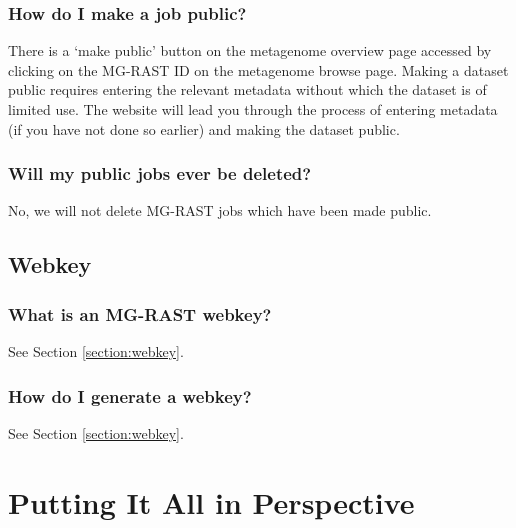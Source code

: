 \documentclass[12pt,fullpage]{report}
\begin{document}
\subsection{How do I make a job public?}
There is a `make public' button on the metagenome overview page accessed by clicking on the MG-RAST ID on the metagenome browse page. Making a dataset public requires entering the relevant metadata without which the dataset is of limited use. The website will lead you through the process of entering metadata (if you have not done so earlier) and making the dataset public.
\subsection{Will my public jobs ever be deleted?}
No, we will not delete MG-RAST jobs which have been made public.
\section{Webkey}
\subsection{What is an MG-RAST webkey?}
See Section \ref{section:webkey}.
\subsection{How do I generate a webkey?}
See Section \ref{section:webkey}.
\chapter{Putting It All in Perspective}
\end{document}
